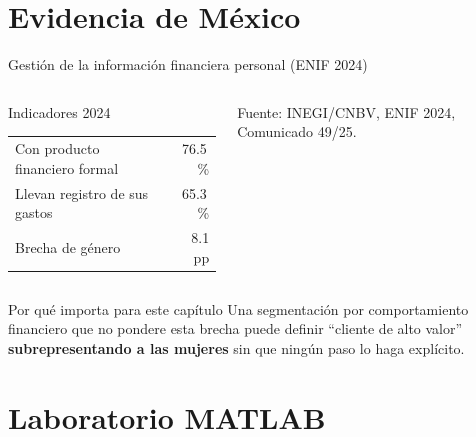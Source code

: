 \documentclass[aspectratio=169,xcolor=dvipsnames]{beamer}
\newcommand{\fuente}[1]{{\tiny\color{IPNgris}Fuente: #1}}
\begin{document}
\section[Evidencia]{Evidencia de México}

\begin{frame}{Gestión de la información financiera personal (ENIF 2024)}
\begin{columns}[c]
  \begin{block}{Indicadores 2024}
    \small
    \begin{tabular}{@{}lr@{}}
      Con producto financiero formal & 76.5\,\% \\
      Llevan registro de sus gastos & 65.3\,\% \\
      Brecha de género & 8.1 pp \\
    \end{tabular}
  \end{block}
  \fuente{INEGI/CNBV, ENIF 2024, Comunicado 49/25.}
\end{columns}
\vspace{4pt}
\begin{alertblock}{Por qué importa para este capítulo}
  \footnotesize Una segmentación por comportamiento financiero que no pondere esta brecha puede definir \enquote{cliente de alto valor} \textbf{subrepresentando a las mujeres} sin que ningún paso lo haga explícito.
\end{alertblock}
\end{frame}

\section[Laboratorio]{Laboratorio MATLAB}
\end{document}
